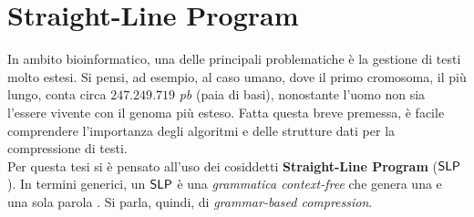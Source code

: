 \section{Straight-Line Program}
\label{slpsec}
In ambito bioinformatico, una delle principali problematiche è la
gestione di testi molto estesi. Si pensi, ad esempio, al caso umano, dove il
primo cromosoma, il più lungo, conta circa $247.249.719$
\textit{pb} (paia di basi), nonostante l'uomo
non sia l'essere vivente con il genoma più esteso. Fatta questa breve
premessa, è facile comprendere l'importanza degli algoritmi e delle strutture
dati per la compressione di testi.\\
Per questa tesi si è pensato all'uso dei cosiddetti \textbf{Straight-Line
  Program} ($\mbox{\rm {\sf SLP}}$). In termini 
generici, un $\mbox{\rm {\sf SLP}}$ è una \textit{grammatica context-free} che 
genera una e una sola parola \cite{slpsurvey}. Si parla, quindi, di
\textit{grammar-based compression}.
